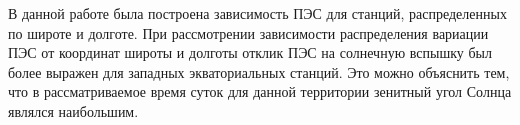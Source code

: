 \documentclass[a4paper]{article}
\begin{document}

В данной работе была построена зависимость ПЭС для станций, распределенных по широте и долготе. При рассмотрении зависимости распределения вариации ПЭС от координат широты и долготы отклик ПЭС на солнечную вспышку был более выражен для западных экваториальных станций. Это можно объяснить тем, что в рассматриваемое время суток для данной территории зенитный угол Солнца являлся наибольшим.




\newpage
\printbibliography
\end{document}
